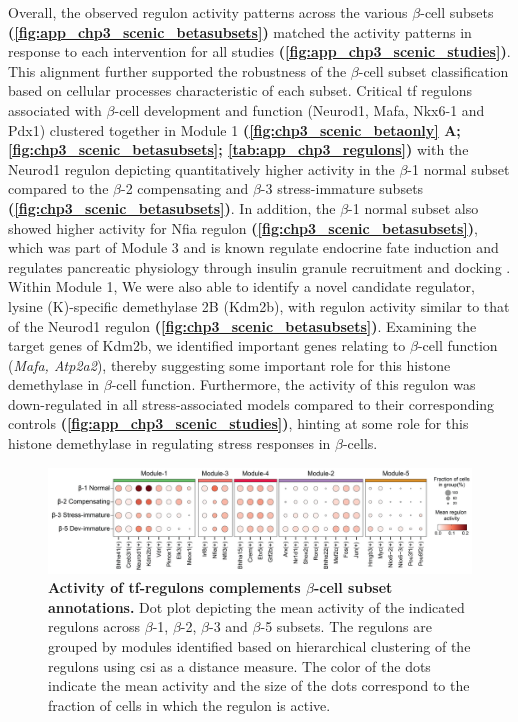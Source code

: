 \par Overall, the observed regulon activity patterns across the various $\beta$-cell subsets \textbf{(\autoref{fig:app_chp3_scenic_betasubsets})} matched the activity patterns in response to each intervention for all studies \textbf{(\autoref{fig:app_chp3_scenic_studies})}. This alignment further supported the robustness of the $\beta$-cell subset classification based on cellular processes characteristic of each subset. Critical \gls{tf} regulons associated with $\beta$-cell development and function (Neurod1, Mafa, Nkx6-1 and Pdx1) clustered together in Module 1 \textbf{(\autoref{fig:chp3_scenic_betaonly} A; \autoref{fig:chp3_scenic_betasubsets}; \autoref{tab:app_chp3_regulons})} with the Neurod1 regulon depicting quantitatively higher activity in the $\beta$-1 normal subset compared to the $\beta$-2 compensating and $\beta$-3 stress-immature subsets \textbf{(\autoref{fig:chp3_scenic_betasubsets})}. In addition, the $\beta$-1 normal subset also showed higher activity for Nfia regulon \textbf{(\autoref{fig:chp3_scenic_betasubsets})}, which was part of Module 3 and is known regulate endocrine fate induction \textbf{\cite{scavuzzo_pancreatic_2018}} and regulates pancreatic physiology through insulin granule recruitment and docking \textbf{\cite{scavuzzo_nfia_2019}}. Within Module 1, We were also able to identify a novel candidate regulator, lysine (K)-specific demethylase 2B (Kdm2b), with regulon activity similar to that of the Neurod1 regulon \textbf{(\autoref{fig:chp3_scenic_betasubsets})}. Examining the target genes of Kdm2b, we identified important genes relating to  $\beta$-cell function (\textit{Mafa, Atp2a2}), thereby suggesting some important role for this histone demethylase in $\beta$-cell function. Furthermore, the activity of this regulon was down-regulated in all stress-associated models compared to their corresponding controls \textbf{(\autoref{fig:app_chp3_scenic_studies})}, hinting at some role for this histone demethylase in regulating stress responses in $\beta$-cells.


\begin{figure}[H]
\centering
\includegraphics[width=\linewidth]{Chapter5/Fig/F3-12-v2-02.png}
\caption[Activity of -regulons complements $\beta$-cell subset annotations]{\textbf{Activity of \gls{tf}-regulons complements $\beta$-cell subset annotations.} Dot plot depicting the mean activity of the indicated regulons across $\beta$-1, $\beta$-2, $\beta$-3 and $\beta$-5 subsets. The regulons are grouped by modules identified based on hierarchical clustering of the regulons using \gls{csi} as a distance measure. The color of the dots indicate the mean activity and the size of the dots correspond to the fraction of cells in which the regulon is active.}
\label{fig:chp3_scenic_betasubsets}
\end{figure}


